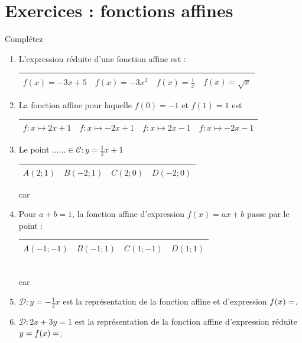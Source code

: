 \documentclass[main.tex]{subfiles}
\begin{document}
\newpage 
{}  
\pagestyle{scrheadings} %
\onehalfspacing
\section{Exercices : fonctions affines}


\begin{exercise}Complétez
\begin{spacing}{2}
\begin{enumerate}[leftmargin=*,label={\arabic*)}]
\item L'expression réduite d'une fonction affine est :\\
\begin{tabularx}{1\linewidth}{|Y|Y|Y|Y|}\hline
$f(x)=-3x+5$&	$f(x)=-3x^2$&$f(x)=\frac{1}{x}$&$f(x)=\sqrt{x}$\\ \hline
\end{tabularx}
\item La fonction affine pour laquelle $f(0)=-1$ et $f(1)=1$ est \\
\begin{tabularx}{1\linewidth}{|Y|Y|Y|Y|}\hline
	$f\colon x\mapsto 2x+1$&$f\colon x\mapsto -2x+1$&$f\colon x\mapsto 2x-1$&$f\colon x\mapsto -2x-1$\\ \hline
\end{tabularx}
\item Le point $\ldots\ldots\in\mathscr{C}\colon y =\tfrac{1}{2}x+1$\\
\begin{tabularx}{1\linewidth}{|Y|Y|Y|Y|}\hline
$A(2;1)$&$B(-2;1)$&$C(2;0)$&$D(-2;0)$\\ \hline
\end{tabularx} 
car \dotfill  
\item Pour $a+b=1$, la fonction affine d'expression $f(x)=ax+b$ passe par le point :\\
\begin{tabularx}{1\linewidth}{|Y|Y|Y|Y|}\hline
$A(-1;-1)$&$B(-1;1)$&$C(1;-1)$&$D(1;1)$\\ \hline
\end{tabularx} \\
car \dotfill 
\item $\mathcal{D}\colon y=-\tfrac{1}{2}x$ est la représentation de la fonction affine et \dotfill d'expression $f(x)=\dotfill $.
\item $\mathcal{D}\colon 2x+3y=1$ est la représentation de la fonction affine d'expression  réduite $y=f(x)=\dotfill $.

\end{enumerate}
\end{spacing}
\end{exercise}
\end{document}
